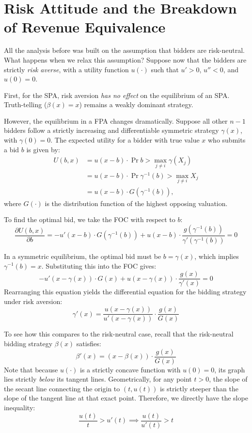 \section{Risk Attitude and the Breakdown of Revenue Equivalence}

 All the analysis before was built on the assumption that bidders are risk-neutral. What happens when we relax this assumption? Suppose now that the bidders are strictly \textit{risk averse}, with a utility function $u(\cdot)$ such that $u' > 0$, $u'' < 0$, and $u(0) = 0$. 

First, for the SPA, risk aversion \textit{has no effect} on the equilibrium of an SPA. Truth-telling ($\beta(x) = x$) remains a weakly dominant strategy.

However, the equilibrium in a FPA changes dramatically. Suppose all other $n-1$ bidders follow a strictly increasing and differentiable symmetric strategy $\gamma(x)$, with $\gamma(0) = 0$. The expected utility for a bidder with true value $x$ who submits a bid $b$ is given by:
\[
\begin{aligned}
  U(b, x) & = u(x-b) \cdot \Pr{b > \max_{j\neq i} \gamma(X_j)}\\
  & = u(x-b) \cdot \Pr{\gamma^{-1}(b) > \max_{j\neq i} X_j}\\
  & = u(x-b) \cdot G(\gamma^{-1}(b)),
\end{aligned}
\]
where $G(\cdot)$ is the distribution function of the highest opposing valuation.

To find the optimal bid, we take the FOC with respect to $b$:
\[
\frac{\partial U(b, x)}{\partial b} = -u'(x-b) \cdot G(\gamma^{-1}(b)) + u(x-b) \cdot \frac{g(\gamma^{-1}(b))}{\gamma'(\gamma^{-1}(b))} = 0
\]

In a symmetric equilibrium, the optimal bid must be $b = \gamma(x)$, which implies $\gamma^{-1}(b) = x$. Substituting this into the FOC gives:
\[
-u'(x-\gamma(x)) \cdot G(x) + u(x-\gamma(x)) \cdot \frac{g(x)}{\gamma'(x)} = 0
\]
Rearranging this equation yields the differential equation for the bidding strategy under risk aversion:
\[
\gamma'(x) = \frac{u(x-\gamma(x))}{u'(x-\gamma(x))} \cdot \frac{g(x)}{G(x)}
\]

To see how this compares to the risk-neutral case, recall that the risk-neutral bidding strategy $\beta(x)$ satisfies:
\[
\beta'(x) = (x-\beta(x)) \cdot \frac{g(x)}{G(x)}
\]
Note that because $u(\cdot)$ is a strictly concave function with $u(0) = 0$, its graph lies strictly \textit{below} its tangent lines. Geometrically, for any point $t > 0$, the slope of the secant line connecting the origin to $(t, u(t))$ is strictly steeper than the slope of the tangent line at that exact point. Therefore, we directly have the slope inequality:
\[
\frac{u(t)}{t} > u'(t) \implies \frac{u(t)}{u'(t)} > t
\]

